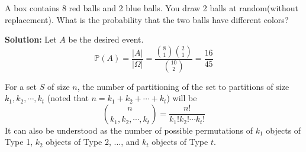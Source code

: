 \begin{eg}
    A box contains 8 red balls and 2 blue balls. You draw 2 balls at random(without replacement). What is the probability that the two balls have different colors?

    \textbf{Solution:}
    Let \(A\) be the desired event.
    \[
        \mathbb{P}(A) = \dfrac{\vert A \vert}{\vert \Omega \vert} = \dfrac{\binom{8}{1}\binom{2}{1}}{\binom{10}{2}} = \dfrac{16}{45}
    \]
\end{eg}

\begin{proposition}
    For a set \(S\) of size \(n\), the number of partitioning of the set to partitions of size \(k_1, k_2, \cdots, k_t\) (noted that \(n = k_1 + k_2 + \cdots + k_t\)) will be
    \[
        \binom{n}{k_1, k_2, \cdots, k_t} = \dfrac{n!}{k_1!k_2!\cdots k_t!}
    \]
    It can also be understood as the number of possible permutations of \(k_1\) objects of Type 1, \(k_2\) objects of Type 2, ..., and \(k_t\) objects of Type \(t\).
\end{proposition}

